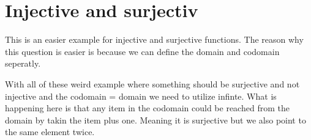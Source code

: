 \documentclass[twocolumn,a4paper]{article}
\begin{document}
\newpage
\section*{Injective and surjectiv}
This is an easier example for injective and surjective functions.
The reason why this question is easier is because we can define the domain and codomain seperatly.
\begin{figure}[ht]
	\centering
\end{figure}

With all of these weird example where something should be surjective and not injective and the codomain = domain we need to utilize infinte.
What is happening here is that any item in the codomain could be reached from the domain by takin the item plus one.
Meaning it is surjective but we also point to the same element twice.
\begin{figure}[ht]
	\centering
\end{figure}
\begin{figure}[ht]
	\centering
\end{figure}
\end{document}
